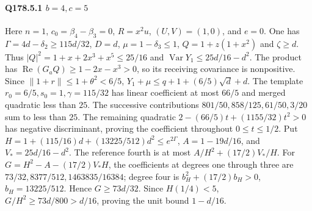 \paragraph{Q178.5.1 $b=\allowbreak 4,\allowbreak c=\allowbreak 5$}
Here $n=\allowbreak 1$, $c_0=\allowbreak \beta_4-\beta_3=\allowbreak 0$, $R=\allowbreak x^2u$,
$(U,\allowbreak V)=\allowbreak (1,\allowbreak 0)$, and $e=\allowbreak 0$.
One has $\Gamma=\allowbreak 4d-\delta_2\ge\allowbreak 115d/32$, $D=\allowbreak d$,
$\mu=\allowbreak 1-\delta_3\le\allowbreak 1$, $Q=\allowbreak 1+z(1+x^2)$ and $\zeta\ge\allowbreak  d$.
Thus $|Q|^2=\allowbreak 1+x+2x^3+x^5\le\allowbreak 25/16$ and
$\operatorname{Var}Y_1\le\allowbreak 25d/16-d^2$.
The product has $\operatorname{Re}(G_aQ)\ge\allowbreak 1-2x-x^3>\allowbreak 0$, so its
receiving covariance is nonpositive.
Since $\|1+r\|\le\allowbreak 1+\theta^2<\allowbreak 6/5$,
$Y_1+\mu\le\allowbreak  q+1+(6/5)\sqrt d+d$.
The template $r_0=\allowbreak 6/5,\allowbreak s_0=\allowbreak 1,\allowbreak \gamma=\allowbreak 115/32$ has linear coefficient
at most $66/5$ and merged quadratic less than $25$.
The successive contributions $801/50,\allowbreak 858/125,\allowbreak 61/50,\allowbreak 3/20$ sum to
less than $25$. The remaining quadratic
$2-(66/5)t+(1155/32)t^2>\allowbreak 0$ has negative discriminant, proving the
coefficient throughout $0\le\allowbreak  t\le\allowbreak 1/2$.
Put
$H=\allowbreak 1+(115/16)d+(13225/512)d^2\le\allowbreak  e^{2\Gamma}$,
$A=\allowbreak 1-19d/16$, and $V_*=\allowbreak 25d/16-d^2$.
The reference fourth is at most $A/H^2+(17/2)V_*/H$.
For $G=\allowbreak H^2-A-(17/2)V_*H$, the coefficients at degrees one through
three are $73/32,\allowbreak 8377/512,\allowbreak 1463835/16384$; degree four is
$b_H^2+(17/2)b_H>\allowbreak 0$, $b_H=\allowbreak 13225/512$.
Hence $G\ge\allowbreak 73d/32$. Since $H(1/4)<\allowbreak 5$,
$G/H^2\ge\allowbreak 73d/800>\allowbreak d/16$, proving the unit bound $1-d/16$.

